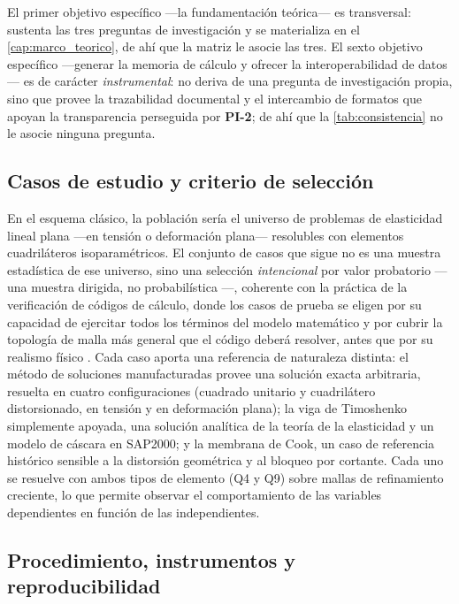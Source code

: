 El primer objetivo específico —la fundamentación teórica— es transversal: sustenta las tres preguntas de investigación y se materializa en el \autoref{cap:marco_teorico}, de ahí que la matriz le asocie las tres. El sexto objetivo específico —generar la memoria de cálculo y ofrecer la interoperabilidad de datos— es de carácter \emph{instrumental}: no deriva de una pregunta de investigación propia, sino que provee la trazabilidad documental y el intercambio de formatos que apoyan la transparencia perseguida por \textbf{PI-2}; de ahí que la \autoref{tab:consistencia} no le asocie ninguna pregunta.

\subsection{Casos de estudio y criterio de selección}
\label{sec:poblacion}

En el esquema clásico, la población sería el universo de problemas de elasticidad lineal plana —en tensión o deformación plana— resolubles con elementos cuadriláteros isoparamétricos. El conjunto de casos que sigue no es una muestra estadística de ese universo, sino una selección \emph{intencional} por valor probatorio —una muestra dirigida, no probabilística \autocite[p.~215]{sampieri2018metodologia}—, coherente con la práctica de la verificación de códigos de cálculo, donde los casos de prueba se eligen por su capacidad de ejercitar todos los términos del modelo matemático y por cubrir la topología de malla más general que el código deberá resolver, antes que por su realismo físico \autocite{oberkampf2010vv}. Cada caso aporta una referencia de naturaleza distinta: el método de soluciones manufacturadas provee una solución exacta arbitraria, resuelta en cuatro configuraciones (cuadrado unitario y cuadrilátero distorsionado, en tensión y en deformación plana); la viga de Timoshenko simplemente apoyada, una solución analítica de la teoría de la elasticidad y un modelo de cáscara en SAP2000; y la membrana de Cook, un caso de referencia histórico sensible a la distorsión geométrica y al bloqueo por cortante. Cada uno se resuelve con ambos tipos de elemento (Q4 y Q9) sobre mallas de refinamiento creciente, lo que permite observar el comportamiento de las variables dependientes en función de las independientes.

\subsection{Procedimiento, instrumentos y reproducibilidad}
\label{sec:validacion-datos}


